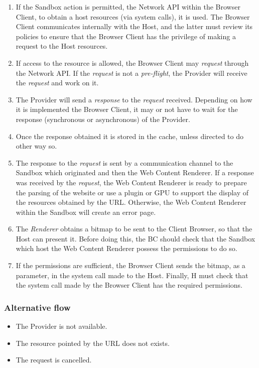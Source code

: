 \documentclass{sig-alternate-05-2015}
\begin{document}
\begin{enumerate}
        \item If the Sandbox action is permitted, the Network API within the Browser Client, to obtain a host resources (via system calls), it is used. The Browser Client communicates internally with the Host, and the latter must review its policies to ensure that the Browser Client has the privilege of making a request to the Host resources.
        \item If access to the resource is allowed, the Browser Client may \textit{request} through the Network API. If the \textit{request} is not a \textit{pre-flight}, the Provider will receive the \textit{request} and work on it.
        \item The Provider will send a \textit{response} to the \textit{request} received. Depending on how it is implemented the Browser Client, it may or not have to wait for the response (synchronous or asynchronous) of the Provider.
        \item Once the response obtained it is stored in the cache, unless directed to do other way so.
        \item The response to the \textit{request} is sent by a communication channel to the Sandbox which originated and then the Web Content Renderer. If a response was received by the \textit{request}, the Web Content Renderer is ready to prepare the parsing of the website or use a plugin or GPU to support the display of the resources obtained by the URL. Otherwise, the Web Content Renderer within the Sandbox will create an error page.
        \item The \textit {Renderer} obtains a bitmap to be sent to the Client Browser, so that the Host can present it. Before doing this, the BC should check that the Sandbox which host the Web Content Renderer possess the permissions to do so.
        \item If the permissions are sufficient, the Browser Client sends the bitmap, as a parameter, in the system call made to the Host. Finally, H must check that the system call made by the Browser Client has the required permissions.
      \end{enumerate}
    \subsubsection*{Alternative flow} 
    \begin{itemize}
    \item The Provider is not available.
    \item The resource pointed by the URL does not exists.
    \item The request is cancelled.
      \end{itemize}
\end{document}

